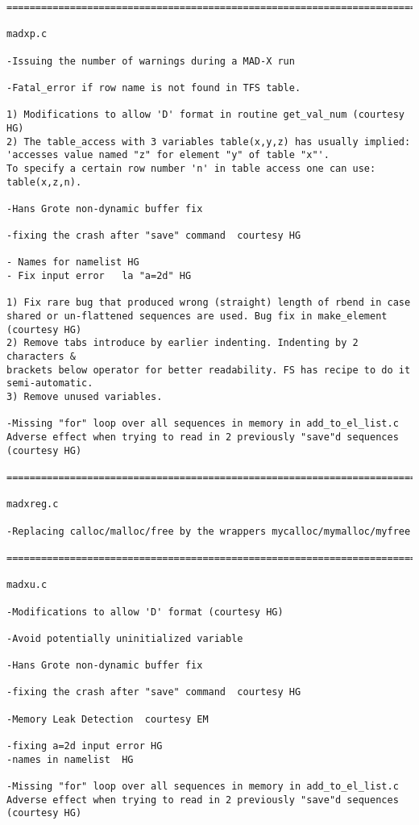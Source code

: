 \begin{verbatim}
=============================================================================

madxp.c

-Issuing the number of warnings during a MAD-X run

-Fatal_error if row name is not found in TFS table.

1) Modifications to allow 'D' format in routine get_val_num (courtesy HG)
2) The table_access with 3 variables table(x,y,z) has usually implied:
'accesses value named "z" for element "y" of table "x"'.
To specify a certain row number 'n' in table access one can use: table(x,z,n).

-Hans Grote non-dynamic buffer fix

-fixing the crash after "save" command  courtesy HG

- Names for namelist HG
- Fix input error   la "a=2d" HG

1) Fix rare bug that produced wrong (straight) length of rbend in case
shared or un-flattened sequences are used. Bug fix in make_element
(courtesy HG)
2) Remove tabs introduce by earlier indenting. Indenting by 2 characters &
brackets below operator for better readability. FS has recipe to do it
semi-automatic.
3) Remove unused variables.

-Missing "for" loop over all sequences in memory in add_to_el_list.c
Adverse effect when trying to read in 2 previously "save"d sequences
(courtesy HG)

=============================================================================

madxreg.c

-Replacing calloc/malloc/free by the wrappers mycalloc/mymalloc/myfree

=============================================================================

madxu.c

-Modifications to allow 'D' format (courtesy HG)

-Avoid potentially uninitialized variable

-Hans Grote non-dynamic buffer fix

-fixing the crash after "save" command  courtesy HG

-Memory Leak Detection  courtesy EM

-fixing a=2d input error HG
-names in namelist  HG

-Missing "for" loop over all sequences in memory in add_to_el_list.c
Adverse effect when trying to read in 2 previously "save"d sequences
(courtesy HG)


\end{verbatim}
